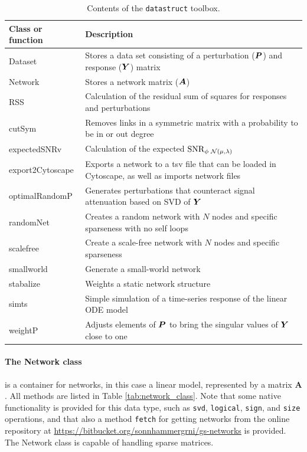 \begin{bibunit}
\begin{table}[htb]
\caption{\label{tab:datastruct}
Contents of the \texttt{datastruct} toolbox.}
\centering
\begin{tabular}{|l|p{10cm}|}
\hline
Class or function & Description\\
\hline
Dataset & Stores a data set consisting of a perturbation (\({\boldsymbol{P}}\)) and response (\({\boldsymbol{Y}}\)) matrix\\
Network & Stores a network matrix (\({\boldsymbol{A}}\))\\
\hline
RSS & Calculation of the residual sum of squares for responses and perturbations\\
cutSym & Removes links in a symmetric matrix with a probability to be in or out degree\\
expectedSNRv & Calculation of the expected \(\operatorname{SNR}_{\phi\, \operatorname{\mathcal{N}(\mu,\lambda)}}\)\\
export2Cytoscape & Exports a network to a tsv file that can be loaded in Cytoscape, as well as imports network files\\
optimalRandomP & Generates perturbations that counteract signal attenuation based on SVD of \({\boldsymbol{Y}}\)\\
randomNet & Creates a random network with \(N\) nodes and specific sparseness with no self loops\\
scalefree & Create a scale-free network with \(N\) nodes and specific sparseness\\
smallworld & Generate a small-world network\\
stabalize & Weights a static network structure\\
simts & Simple simulation of a time-series response of the linear ODE model\\
weightP & Adjusts elements of \({\boldsymbol{P}}\) to bring the singular values of \({\boldsymbol{Y}}\) close to one\\
\hline
\end{tabular}
\end{table}


\paragraph{The Network class}
\label{sec:network_class}
is a container for networks, in this case a linear model, represented by a matrix \(\boldsymbol{A}\).
All methods are listed in Table \ref{tab:network_class}.
Note that some native \matlab functionality is provided for this data type, such as \texttt{svd}, \texttt{logical}, \texttt{sign}, and \texttt{size} operations, and that also a method \texttt{fetch} for getting networks from the online repository at \url{https://bitbucket.org/sonnhammergrni/gs-networks} is provided.
The Network class is capable of handling sparse matrices.


\end{bibunit}
